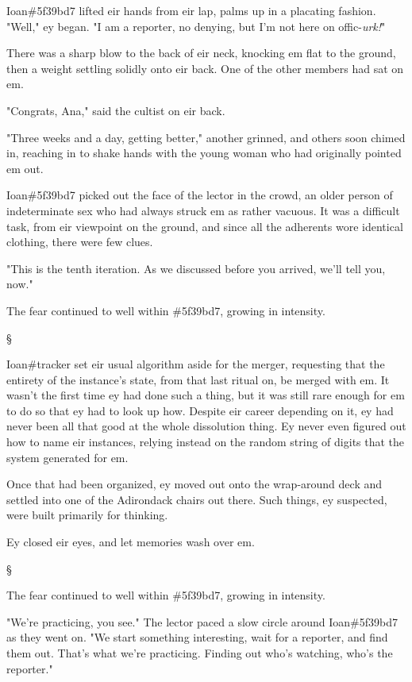 \documentclass[12pt,letterpaper,oneside]{memoir}
\newcommand\secdiv{
  \begin{center}
    \S
  \end{center}
}
\begin{document}
  Ioan\#5f39bd7 lifted eir hands from eir lap, palms up in a placating fashion. "Well," ey began. "I am a reporter, no denying, but I'm not here on offic-\emph{urk!}"

  There was a sharp blow to the back of eir neck, knocking em flat to the ground, then a weight settling solidly onto eir back. One of the other members had sat on em.

  "Congrats, Ana," said the cultist on eir back.

  "Three weeks and a day, getting better," another grinned, and others soon chimed in, reaching in to shake hands with the young woman who had originally pointed em out.

  Ioan\#5f39bd7 picked out the face of the lector in the crowd, an older person of indeterminate sex who had always struck em as rather vacuous. It was a difficult task, from eir viewpoint on the ground, and since all the adherents wore identical clothing, there were few clues.

  "This is the tenth iteration. As we discussed before you arrived, we'll tell you, now."

  The fear continued to well within \#5f39bd7, growing in intensity.

  \secdiv

  Ioan\#tracker set eir usual algorithm aside for the merger, requesting that the entirety of the instance's state, from that last ritual on, be merged with em. It wasn't the first time ey had done such a thing, but it was still rare enough for em to do so that ey had to look up how. Despite eir career depending on it, ey had never been all that good at the whole dissolution thing. Ey never even figured out how to name eir instances, relying instead on the random string of digits that the system generated for em.

  Once that had been organized, ey moved out onto the wrap-around deck and settled into one of the Adirondack chairs out there. Such things, ey suspected, were built primarily for thinking.

  Ey closed eir eyes, and let memories wash over em.

  \secdiv

  The fear continued to well within \#5f39bd7, growing in intensity.

  "We're practicing, you see." The lector paced a slow circle around Ioan\#5f39bd7 as they went on. "We start something interesting, wait for a reporter, and find them out. That's what we're practicing. Finding out who's watching, who's the reporter."
\end{document}
